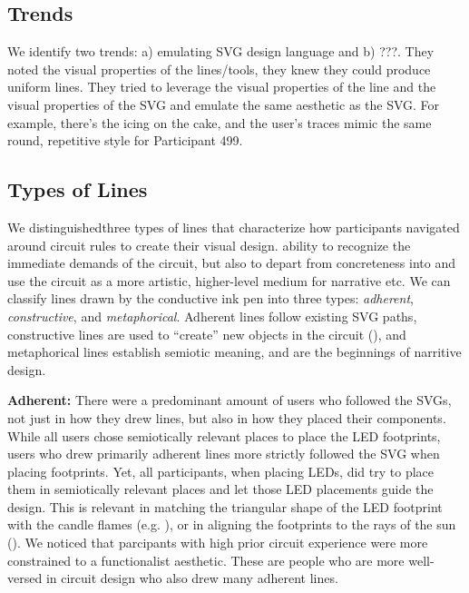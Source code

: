 \documentclass{sigchi}
\begin{document}
  \subsection{Trends}
  
  We identify two trends: a) emulating SVG design language and b) ???. They noted the visual properties of the lines/tools, they knew they could produce uniform lines. They tried to leverage the visual properties of the line and the visual properties of the SVG and emulate the same aesthetic as the SVG. For example, there's the icing on the cake, and the user's traces mimic the same round, repetitive style for Participant 499. 
 
  
  \subsection{Types of Lines}
   We distinguishedthree types of lines that characterize how participants navigated around circuit rules to create their visual design. 
   ability to recognize the immediate demands of the circuit, but also to depart from concreteness into and use the circuit as a more artistic, higher-level medium for narrative etc.
  We can classify lines drawn by the conductive ink pen into three types: \textit{adherent}, \textit{constructive}, and \textit{metaphorical}. Adherent lines follow existing SVG paths, constructive lines are used to ``create'' new objects in the circuit (), and metaphorical lines establish semiotic meaning, and are the beginnings of narritive design.

  
  \textbf{Adherent:}  There were a predominant amount of users who followed the SVGs, not just in how they drew lines, but also in how they placed their components. While all users chose semiotically relevant places to place the LED footprints, users who drew primarily adherent lines more strictly followed the SVG when placing footprints. Yet, all participants, when placing LEDs, did try to place them in semiotically relevant places and let those LED placements guide the design. This is relevant in matching the triangular shape of the LED footprint with the candle flames (e.g. ), or in aligning the footprints to the rays of the sun (). We noticed that parcipants with high prior circuit experience were more constrained to a functionalist aesthetic. These are people who are more well-versed in circuit design who also drew many adherent lines.
  
\end{document}

